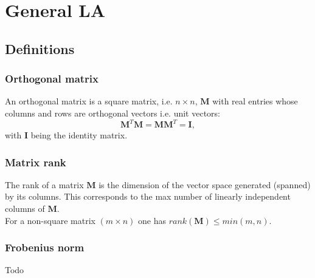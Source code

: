 \documentclass[10pt]{article}
\begin{document}
\section{General LA}
\subsection{Definitions}
\subsubsection{Orthogonal matrix}
An orthogonal matrix is a square matrix, i.e. $n\!\times\! n$, $\mathbf{M}$ with real entries whose columns and rows are orthogonal vectors i.e. unit vectors:
\begin{equation}
	\mathbf{M}^T\mathbf{M} = \mathbf{M}\mathbf{M}^T = \mathbf{I},
\end{equation}
with $\mathbf{I}$ being the identity matrix.
\subsubsection{Matrix rank}
The rank of a matrix $\mathbf{M}$ is the dimension of the vector space generated (spanned) by its columns. This corresponds to the max number of linearly independent columns of $\mathbf{M}$.\\
For a non-square matrix $(m\!\times\! n)$ one has $rank(\mathbf{M})\leq min(m,n)$.
\subsubsection{Frobenius norm}
Todo
\printbibliography[heading=bibintoc]
\end{document}
